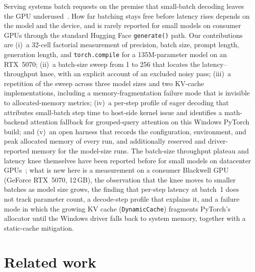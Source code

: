 \documentclass[11pt]{article}
\begin{document}
Serving systems batch requests on the premise that small-batch decoding leaves the GPU underused~\cite{yu2022orca,kwon2023vllm,pope2023scaling}.
How far batching stays free before latency rises depends on the model and the device, and is rarely reported for small models on consumer GPUs through the standard Hugging Face \texttt{generate()} path.
Our contributions are (i)~a 32-cell factorial measurement of precision, batch size, prompt length, generation length, and \texttt{torch.compile} for a 135M-parameter model on an RTX~5070; (ii)~a batch-size sweep from 1 to 256 that locates the latency--throughput knee, with an explicit account of an excluded noisy pass; (iii)~a repetition of the sweep across three model sizes and two KV-cache implementations, including a memory-fragmentation failure mode that is invisible to allocated-memory metrics; (iv)~a per-step profile of eager decoding that attributes small-batch step time to host-side kernel issue and identifies a math-backend attention fallback for grouped-query attention on this Windows PyTorch build; and (v)~an open harness that records the configuration, environment, and peak allocated memory of every run, and additionally reserved and driver-reported memory for the model-size runs.
The batch-size throughput plateau and latency knee themselves have been reported before for small models on datacenter GPUs~\cite{recasens2024pareto,recasens2025memorygap}; what is new here is a measurement on a consumer Blackwell GPU (GeForce RTX~5070, 12\,GB), the observation that the knee moves to smaller batches as model size grows, the finding that per-step latency at batch~1 does not track parameter count, a decode-step profile that explains it, and a failure mode in which the growing KV cache (\texttt{DynamicCache}) fragments PyTorch's allocator until the Windows driver falls back to system memory, together with a static-cache mitigation.

\section{Related work}
\end{document}
